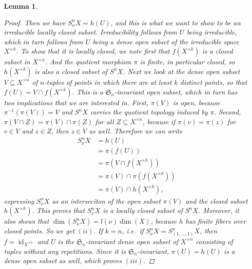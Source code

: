 \documentclass[12pt,a4paper]{amsart}
\theoremstyle{plain}
\newtheorem{lm}[thm]{Lemma}
\theoremstyle{definition}
\theoremstyle{remark}
\begin{document}
\begin{lm}
\begin{proof}
    Then we have $S^{n}_{\nu}X = h(U)$, and this is what we want to show to be an irreducible locally closed subset.
    Irreducibility follows from $U$ being irreducible, which in turn follows from $U$ being a dense open subset of the irreducible space $X^{\times k}$.
    To show that it is locally closed, we note first that $f(X^{\times k})$ is a closed subset in $X^{\times n}$.
    And the quotient morphism $\pi$ is finite, in particular closed, so $h(X^{\times k})$ is also a closed subset of $S^{n}X$.
    Next we look at the dense open subset $V \subseteq X^{\times n}$ of $n$-tuples of points in which there are at least $k$ distinct points, so that $f(U) = V \cap f(X^{\times k})$.
    This is a $\mathfrak{S}_{n}$-invariant open subset, which in turn has two implications that we are interested in.
    First, $\pi(V)$ is open, because $\pi^{-1}(\pi(V)) = V$ and $S^{n}X$ carries the quotient topology induced by $\pi$.
    Second, $\pi(V \cap Z) = \pi(V) \cap \pi(Z)$ for all $Z \subseteq X^{\times n}$, because if $\pi(v) = \pi(z)$ for $v \in V$ and $z \in Z$, then $z \in V$ as well.
    Therefore we can write
    \begin{align*}
      S_{\nu}^{n}X & = h(U) \\
      & = \pi(f(U)) \\
      & = \pi(V \cap f(X^{\times k})) \\
      & = \pi(V) \cap \pi(f(X^{\times k})) \\
      & = \pi(V) \cap h(X^{\times k}),
    \end{align*}
    expressing $S_{\nu}^{n}X$ as an interseciton of the open subset $\pi(V)$ and the closed subset $h(X^{\times k})$.
    This proves that $S_{\nu}^{n}X$ is a locally closed subset of $S^{n}X$.
    Moreover, it also shows that $\dim(S_{\nu}^{n}X) = l(\nu)\dim(X)$, because $h$ has finite fibers over closed points.
    So we get $(ii)$.
    If $k = n$, i.e.~if $S^{n}_{\nu}X = S^{n}_{(1,\ldots, 1)}X$, then $f = \operatorname{id}_{X^{\times n}}$ and $U$ is the $\mathfrak{S}_{n}$-invariant dense open subset of $X^{\times n}$ consisting of tuples without any repetitions.
    Since it is $\mathfrak{S}_{n}$-invariant, $\pi(U) = h(U)$ is a dense open subset as well, which proves $(iii)$.
    

\end{proof}
\end{lm}
\end{document}
